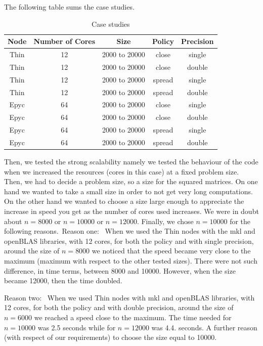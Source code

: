 \documentclass{article}
\begin{document}
The following table sums the case studies.

\begin{table}[h]
\centering
\begin{tabular}{|c|c|c|c|c|}
\hline
\textbf{Node} & \textbf{Number of Cores} & \textbf{Size} & \textbf{Policy} & \textbf{Precision} \\
\hline
Thin & 12 & 2000 to 20000 & close & single \\
Thin & 12 & 2000 to 20000 & close & double \\
Thin & 12 & 2000 to 20000 & spread & single \\
Thin & 12 & 2000 to 20000 & spread & double \\
\hline
Epyc & 64 & 2000 to 20000 & close & single \\
Epyc & 64 & 2000 to 20000 & close & double \\
Epyc & 64 & 2000 to 20000 & spread & single \\
Epyc & 64 & 2000 to 20000 & spread & double \\
\hline
\end{tabular}
\caption{Case studies}
\label{tab:node-config}
\end{table}

Then, we tested the strong scalability namely we tested the behaviour of the code when we increased the resources (cores in this case) at a fixed problem size.
Then, we had to decide a problem size, so a size for the squared matrices. 
On one hand we wanted to take a small size in order to not get very long computations. On the other hand we wanted to choose a size large enough to appreciate the increase in speed you get as the number of cores used increases. 
We were in doubt about $ n = 8000$ or $ n= 10000$ or $ n= 12000$.
Finally, we chose $ n = 10000 $ for the following reasons.\
Reason one: \
When we used the Thin nodes with the mkl and openBLAS libraries, with 12 cores, for both the policy and with single precision, around the size of $ n = 8000 $ we noticed that the speed became very close to the maximum (maximum with respect to the other tested sizes). There were not such difference, in time terms, between 8000 and 10000. However, when the size became 12000, then the time doubled.  

Reason two: \
When we used Thin nodes with mkl and openBLAS libraries, with 12 cores, for both the policy and with double precision, around the size of $ n = 6000 $ we reached a speed close to the maximum. The time needed for $ n = 10000 $ was 2.5 seconds while for $ n = 12000 $ was 4.4. seconds. A further reason (with respect of our requirements) to choose the size equal to 10000.
\end{document}
